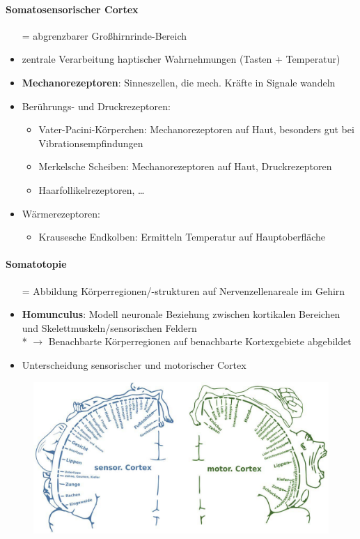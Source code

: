 \paragraph{Somatosensorischer Cortex}
\begin{itemize}
  \item[=] abgrenzbarer Großhirnrinde-Bereich
  \item zentrale Verarbeitung haptischer Wahrnehmungen (Tasten + Temperatur)
  \item \textbf{Mechanorezeptoren}: Sinneszellen, die mech. Kräfte in Signale wandeln
  \item Berührungs- und Druckrezeptoren:
  \begin{itemize}
    \item Vater-Pacini-Körperchen: Mechanorezeptoren auf Haut, besonders gut bei Vibrationsempfindungen
    \item Merkelsche Scheiben: Mechanorezeptoren auf Haut, Druckrezeptoren
    \item Haarfollikelrezeptoren, \dots
  \end{itemize}
  \item Wärmerezeptoren:
  \begin{itemize}
    \item Krausesche Endkolben: Ermitteln Temperatur auf Hauptoberfläche
  \end{itemize}
\end{itemize}

\paragraph{Somatotopie}
\begin{itemize}
  \item[=] Abbildung Körperregionen/-strukturen auf Nervenzellenareale im Gehirn
  \item \textbf{Homunculus}: Modell neuronale Beziehung zwischen kortikalen Bereichen und Skelettmuskeln/sensorischen Feldern \\* \( \to \) Benachbarte Körperregionen auf benachbarte Kortexgebiete abgebildet
  \item Unterscheidung sensorischer und motorischer Cortex
\end{itemize}
\begin{figure}[H]
  \centering
  \includegraphics[width=.7\linewidth]{assets/img/homunculus.png}
\end{figure}

